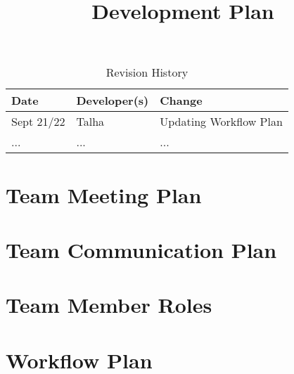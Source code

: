 \documentclass{article}
\title{Development Plan\\\progname}
\author{\authname}
\date{}
\begin{document}
\begin{table}[hp]
\caption{Revision History} \label{TblRevisionHistory}
\begin{tabularx}{\textwidth}{llX}
\toprule
\textbf{Date} & \textbf{Developer(s)} & \textbf{Change}\\
\midrule
Sept 21/22 & Talha & Updating Workflow Plan\\
... & ... & ...\\
\bottomrule
\end{tabularx}
\end{table}

\newpage

\maketitle


\section{Team Meeting Plan}

\section{Team Communication Plan}

\section{Team Member Roles}

\section{Workflow Plan}
\end{document}
